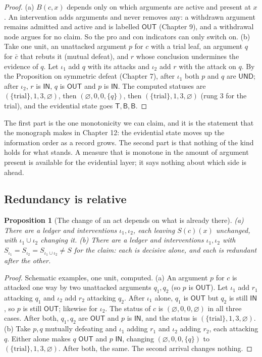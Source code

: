 \documentclass[11pt]{article}
\theoremstyle{plain}
\newtheorem{proposition}[theorem]{Proposition}
\theoremstyle{definition}
\theoremstyle{remark}
\newcommand{\IN}{\textsf{IN}}
\newcommand{\OUT}{\textsf{OUT}}
\newcommand{\UND}{\textsf{UND}}
\begin{document}
\begin{proof}
(a) $B(c,x)$ depends only on which arguments are active and present at $x$. An intervention adds arguments and never removes any: a withdrawn argument remains admitted and active and is labelled $\OUT$ (Chapter 9), and a withdrawal node argues for no claim. So the pro and con indicators can only switch on. (b) Take one unit, an unattacked argument $p$ for $c$ with a trial leaf, an argument $q$ for $\bar c$ that rebuts it (mutual defeat), and $r$ whose conclusion undermines the evidence of $q$. Let $\iota_1$ add $q$ with its attacks and $\iota_2$ add $r$ with the attack on $q$. By the Proposition on symmetric defeat (Chapter 7), after $\iota_1$ both $p$ and $q$ are $\UND$; after $\iota_2$, $r$ is $\IN$, $q$ is $\OUT$ and $p$ is $\IN$. The computed statuses are $(\{\text{trial}\},1,3,\varnothing)$, then $(\varnothing,0,0,\{q\})$, then $(\{\text{trial}\},1,3,\varnothing)$ (rung $3$ for the trial), and the evidential state goes $\mathsf T,\mathsf B,\mathsf B$. \qedhere
\end{proof}

The first part is the one monotonicity we can claim, and it is the statement that the monograph makes in Chapter 12: the evidential state moves up the information order as a record grows. The second part is that nothing of the kind holds for what stands. A measure that is monotone in the amount of argument present is available for the evidential layer; it says nothing about which side is ahead.

\subsection{Redundancy is relative}

\begin{proposition}[The change of an act depends on what is already there]\label{prop:order}
(a) There are a ledger and interventions $\iota_1,\iota_2$, each leaving $S(c)(x)$ unchanged, with $\iota_1\cup\iota_2$ changing it. (b) There are a ledger and interventions $\iota_1,\iota_2$ with $S_{\iota_1}=S_{\iota_2}=S_{\iota_1\cup\iota_2}\ne S$ for the claim: each is decisive alone, and each is redundant after the other.
\end{proposition}

\begin{proof}
Schematic examples, one unit, computed.
(a) An argument $p$ for $c$ is attacked one way by two unattacked arguments $q_1,q_2$ (so $p$ is $\OUT$). Let $\iota_1$ add $r_1$ attacking $q_1$ and $\iota_2$ add $r_2$ attacking $q_2$. After $\iota_1$ alone, $q_1$ is $\OUT$ but $q_2$ is still $\IN$, so $p$ is still $\OUT$; likewise for $\iota_2$. The status of $c$ is $(\varnothing,0,0,\varnothing)$ in all three cases. After both, $q_1,q_2$ are $\OUT$ and $p$ is $\IN$, and the status is $(\{\text{trial}\},1,3,\varnothing)$.
(b) Take $p,q$ mutually defeating and $\iota_1$ adding $r_1$ and $\iota_2$ adding $r_2$, each attacking $q$. Either alone makes $q$ $\OUT$ and $p$ $\IN$, changing $(\varnothing,0,0,\{q\})$ to $(\{\text{trial}\},1,3,\varnothing)$. After both, the same. The second arrival changes nothing. \qedhere
\end{proof}
\end{document}
